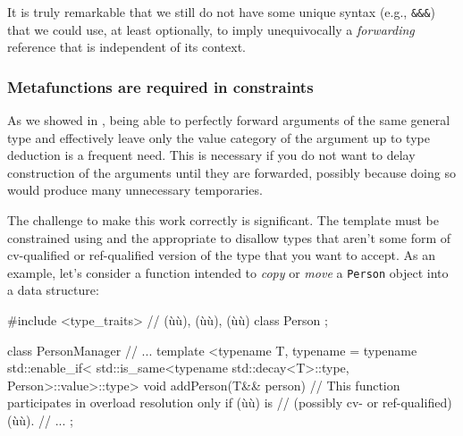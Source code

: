 \noindent It is truly remarkable that we still do not have some unique syntax
(e.g., \lstinline!&&&!) that we could use, at least optionally, to imply
unequivocally a \emph{forwarding} reference that is independent of its
context.

\subsubsection[Metafunctions are required in constraints]{Metafunctions are required in constraints}\label{metafunctions-are-required-in-constraints}

As we showed in ,
being able to
perfectly forward arguments of the same general type and effectively
leave only the value category of the argument up to type deduction is a frequent need. This
is necessary if you do not want to delay construction of the arguments
until they are forwarded, possibly because doing so would produce many
unnecessary temporaries.

The challenge to make this work correctly is significant. The template
must be constrained using  and the appropriate
 to disallow types that aren't some form of
cv-qualified or ref-qualified version of the type that you want to
accept. As an example, let's consider a function intended to \emph{copy}
or \emph{move} a \lstinline!Person! object into a data structure:

\begin{emcppshiddenlisting}[emcppsbatch=e20]
#include <type_traits>  // (ù{}ù), (ù{}ù), (ù{}ù)
class Person {};
\end{emcppshiddenlisting}
\begin{emcppslisting}[emcppsbatch=e20]
class PersonManager {
// ...
template <typename T, typename = typename std::enable_if<
       std::is_same<typename std::decay<T>::type, Person>::value>::type>
void addPerson(T&& person) {}
    // This function participates in overload resolution only if (ù{}ù) is
    // (possibly cv- or ref-qualified) (ù{}ù).
// ...
};
\end{emcppslisting}

